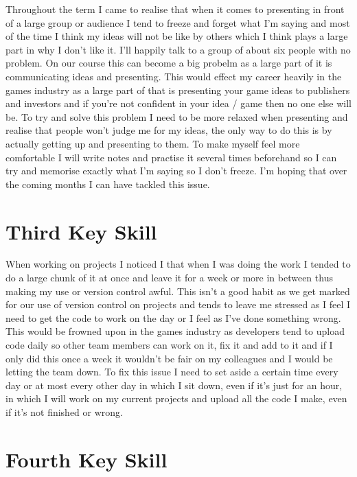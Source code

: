 \documentclass{scrartcl}
\begin{document}
Throughout the term I came to realise that when it comes to presenting in front of a large group or audience I tend to freeze and forget what I'm saying and most of the time I think my ideas will not be like by others which I think plays a large part in why I don't like it. I'll happily talk to a group of about six people with no problem. On our course this can become a big probelm as a large part of it is communicating ideas and presenting. This would effect my career heavily in the games industry as a large part of that is presenting your game ideas to publishers and investors and if you're not confident in your idea / game then no one else will be. To try and solve this problem I need to be more relaxed when presenting and realise that people won't judge me for my ideas, the only way to do this is by actually getting up and presenting to them. To make myself feel more comfortable I will write notes and practise it several times beforehand so I can try and memorise exactly what I'm saying so I don't freeze. I'm hoping that over the coming months I can have tackled this issue. 

\section{Third Key Skill}

When working on projects I noticed I that when I was doing the work I tended to do a large chunk of it at once and leave it for a week or more in between thus making my use or version control awful. This isn't a good habit as we get marked for our use of version control on projects and tends to leave me stressed as I feel I need to get the code to work on the day or I feel as I've done something wrong. This would be frowned upon in the games industry as developers tend to upload code daily so other team members can work on it, fix it and add to it and if I only did this once a week it wouldn't be fair on my colleagues and I would be letting the team down. To fix this issue I need to set aside a certain time every day or at most every other day in which I sit down, even if it's just for an hour, in which I will work on my current projects and upload all the code I make, even if it's not finished or wrong.

\section{Fourth Key Skill}
\end{document}
